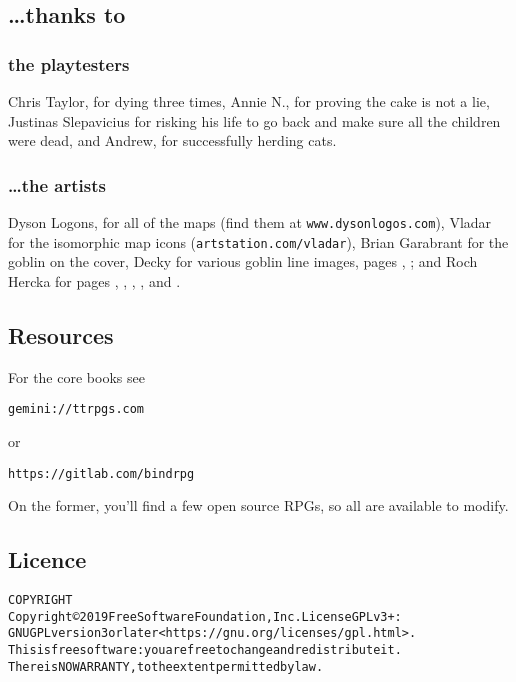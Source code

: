 \vspace{3cm}

\begin{multicols}{2}

\subsection*{\ldots thanks to}
\subsubsection*{the playtesters}
Chris Taylor, for dying three times,
Annie N., for proving the cake is not a lie,
Justinas Slepavicius for risking his life to go back and make sure all the children were dead,
and Andrew, for successfully herding cats.

\subsubsection*{\ldots the artists}

Dyson Logons, for all of the maps (find them at {\tt www.dysonlogos.com}),
\iftoggle{hardcore}{%
Daniel F. Walthall for the flat dungeon icon images in the Alchemist's tower,
}{}%
Vladar for the isomorphic map icons ({\tt artstation.com/vladar}),
Brian Garabrant for the goblin on the cover,
Decky for various goblin line images, pages \pageref{Decky:armoury}, \pageref{Decky/screech};
and Roch Hercka for pages \pageref{roch:transformation}, \pageref{roch:waking}, \pageref{roch:dragon}, \pageref{roch:garden}, and \pageref{roch:ogres}.

\columnbreak

\subsection{Resources}

For the core books see 

\begin{alltt} gemini://ttrpgs.com \end{alltt} 
or 
\begin{alltt} https://gitlab.com/bindrpg \end{alltt}
On the former, you'll find a few open source RPGs, so all are available to modify.

\end{multicols}

\subsection*{Licence}

\begin{alltt}
COPYRIGHT
       Copyright \copyright 2019 Free Software Foundation, Inc.  License GPLv3+:
	GNU GPL version 3 or later <https://gnu.org/licenses/gpl.html>.
       This is free software: you are free to change and redistribute it.
	There is NO WARRANTY, to the extent permitted by law.

\end{alltt}

